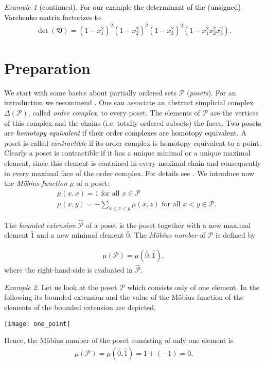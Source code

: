 \documentclass[12pt]{amsart}
\def\Var{{\mathfrak V}}
\theoremstyle{plain}
\numberwithin{Lemma}{\DefaultNumberTheoremWithin}
\numberwithin{Claim}{\DefaultNumberTheoremWithin}
\numberwithin{Theorem}{\DefaultNumberTheoremWithin}
\numberwithin{Corollary}{\DefaultNumberTheoremWithin}
\numberwithin{Proposition}{\DefaultNumberTheoremWithin}
\numberwithin{Conjecture}{\DefaultNumberTheoremWithin}
\numberwithin{Situation}{\DefaultNumberTheoremWithin}
\numberwithin{Note}{\DefaultNumberTheoremWithin}
\theoremstyle{definition}
\numberwithin{Definition}{\DefaultNumberTheoremWithin}
\theoremstyle{definition}
\numberwithin{Question}{\DefaultNumberTheoremWithin}
\theoremstyle{definition}
\numberwithin{Problem}{\DefaultNumberTheoremWithin}
\theoremstyle{remark} \newtheorem{Remark}{Remark}
\numberwithin{Remark}{\DefaultNumberTheoremWithin}
\theoremstyle{remark}
\newtheorem{Example}{Example}
\numberwithin{Example}{\DefaultNumberTheoremWithin}
\numberwithin{Case}{Lemma}
\numberwithin{Step}{Lemma}
\newcommand{\new}[1]{\textcolor{black}{#1}}
\begin{document}
\begin{Example}[continued]
\new{For our example the determinant of the (unsigned) Varchenko matrix factorizes to
\begin{align*}
\det (\Var) = (1 - x_1^2)^2 (1 - x_2^2)^2 (1 - x_3^2)^2 (1 - x_1^2 x_2^2 x_3^2).
\end{align*}}
\end{Example}

\section{Preparation}\label{sec:3}

We start with some basics about partially ordered sets $\mathcal{P}$ (\emph{posets}). For an introduction we recommend \cite{W}. One can associate an abstract simplicial complex $\Delta(\mathcal{P})$, called \emph{order complex}, to every poset. The elements of $\mathcal{P}$ are the vertices of this complex and the chains (i.e. totally ordered subsets) the faces. \new{Two posets are \emph{homotopy equivalent} if their order complexes are homotopy equivalent.} A poset is called \emph{contractible} if its order complex is homotopy equivalent to a point. Clearly a poset is contractible if it has a unique minimal or a unique maximal element, since this element is contained in every maximal chain and consequently in every maximal face of the order complex. For details see \cite{W}. We introduce now the \emph{M\"obius function} $\mu$ of a poset:
\begin{align*}
&\mu(x,x) = 1\text{ for all }x \in \mathcal{P}\\
&\mu(x,y) = -\sum_{x \leq z <y} \mu(x,z)\text{ for all }x <y \in \mathcal{P}.  
\end{align*}

The \emph{bounded extension} $\hat{\mathcal{P}}$ of a poset is the poset together with a new maximal element $\hat{1}$ and a new minimal element $\hat{0}$. 
The \emph{M\"obius number} of $\mathcal{P}$ is defined by

\begin{align*}
\mu(\mathcal{P}) = \mu(\hat{0},\hat{1}), 
\end{align*}
where the right-hand-side is evaluated in $\hat{\mathcal{P}}$.
\begin{Example}\label{ex:point}
Let us look at the poset $\mathcal{P}$ which consists only of one element. In the following its bounded extension and the value of the M\"obius function of the elements of the bounded extension are depicted.
\begin{center}
\texttt{[image: one\_point]}
\end{center}
Hence, the M\"obius number of the poset consisting of only one element is
\begin{align*}
\mu(\mathcal{P}) = \mu(\hat{0},\hat{1}) = 1 + (-1) = 0.
\end{align*}
\end{Example}
\end{document}
